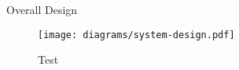 \documentclass{report}
\begin{document}
\begin{section}{Overall Design}

\begin{figure*}[t]
\centering
\texttt{[image: diagrams/system-design.pdf]}
\caption{Test}
\end{figure*}

\end{section}
\end{document}
